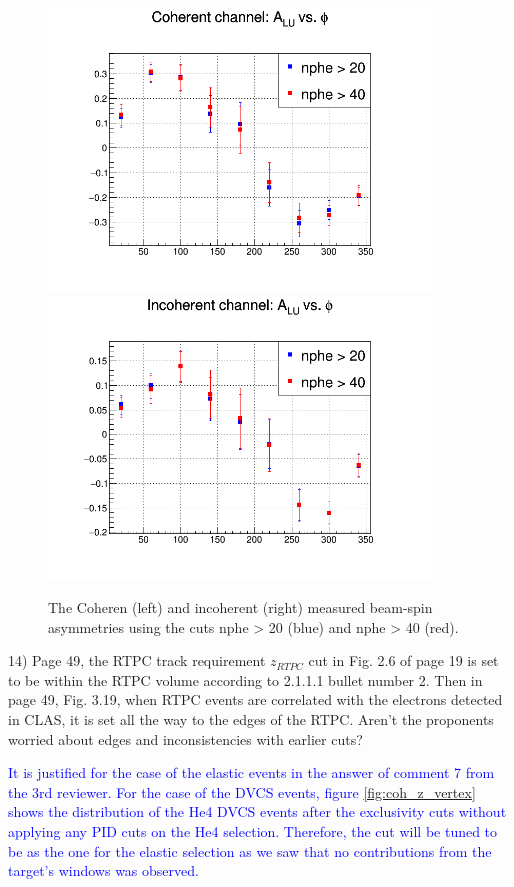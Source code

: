 \begin{figure}[h!]
   \hspace{-1.0 cm}
\includegraphics[height=7.5cm]{fig/nphe_BSA_Coherent.png}
   \hspace{-1.0 cm}
\includegraphics[height=7.5cm]{fig/nphe_BSA_InCoherent.png}
\caption{The Coheren (left) and incoherent (right) measured beam-spin 
asymmetries using the cuts nphe > 20 (blue) and nphe > 40 (red). }
\label{fig:nphe_coh_incoh_alu}
\end{figure}


14) Page 49, the RTPC track requirement $z_{RTPC}$ cut in Fig. 2.6 of page 19 
is set to be within the RTPC volume according to  2.1.1.1 bullet number 2. Then 
in page 49, Fig. 3.19, when RTPC events are correlated with the electrons 
detected in CLAS, it is set all the way to the edges of the RTPC. Aren't the 
proponents worried about edges and inconsistencies with earlier cuts?

\textcolor{blue}{
  It is justified for the case of the elastic events in the answer of comment 7 
  from the 3rd reviewer. For the case of the DVCS events, figure 
  \ref{fig:coh_z_vertex} shows the distribution of the He4 DVCS events after 
  the exclusivity cuts without applying any PID cuts on the He4 selection.  
  Therefore, the cut will be tuned to be as the one for the elastic selection 
  as we saw that no contributions from the target's windows was observed.}\\

